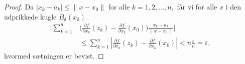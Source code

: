 \begin{proof}
   Da $|x_k - a_k| \leq \| x - x_0 \|$ for alle $k = 1,2, \ldots, n,$ får vi for alle $x$ i den udprikkede kugle $\dot{B}_\delta (x_0)$
   \begin{align*}
     \bigg| \sum_{k = 1}^n &\bigg( \frac{\partial f}{\partial x_k}(z_k) - \frac{\partial f}{\partial x_k}(x_0) \bigg) \frac{x_k - a_k}{\| x - x_0 \|} \bigg| \\
     &\leq \sum_{k = 1}^n \left|\frac{\partial f}{\partial x_k}(z_k) - \frac{\partial f}{\partial x_k}(x_0)\right| < n\frac{\varepsilon}{n} = \varepsilon,
   \end{align*}
   hvormed sætningen er bevist.
\end{proof}
